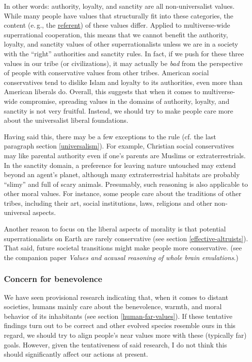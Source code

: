 In other words: authority, loyalty, and sanctity are all
non-universalist values. While many people have values that structurally
fit into these categories, the content (e.\,g., the
\href{https://en.wikipedia.org/wiki/Referent}{referent}) of these
values differ. Applied to multiverse-wide superrational cooperation,
this means that we cannot benefit the authority, loyalty, and sanctity
values of other superrationalists unless we are in a society with the
``right'' authorities and sanctity rules. In fact, if we push for these
three values in our tribe (or civilizations), it may actually be
\emph{bad} from the perspective of people with conservative values from
other tribes. American social conservatives tend to dislike Islam and
loyalty to its authorities, even more than American liberals do.
Overall, this suggests that when it comes to multiverse-wide compromise,
spreading values in the domains of authority, loyalty, and sanctity is
not very fruitful. Instead, we should try to make people care more about
the universalist liberal foundations.

Having said this, there may be a few exceptions to the rule (cf. the
last paragraph section \ref{universalism}). For example,
Christian social conservatives may like parental authority even if one's
parents are Muslims or extraterrestrials. In the sanctity domain, a
preference for leaving nature untouched may extend beyond an agent's
planet, although many extraterrestrial habitats are probably ``slimy''
and full of scary animals. Presumably, such reasoning is also applicable
to other moral values. For instance, some people care about the
traditions of other tribes, including their art, social institutions,
laws, religions and other non-universal aspects.

Another reason to focus on the liberal aspects of morality is that
potential superrationalists on Earth are rarely conservative (see
section \ref{effective-altruists}). That said, future societal transitions might make people
more conservative. (see the companion paper \textit{Values and acausal reasoning of whole brain
emulations}.)

\subsubsection{Concern for benevolence}\label{concern-for-benevolence}

We have seen provisional research indicating that, when it comes to
distant societies, humans mainly care about the benevolence, warmth, and
moral behavior of its inhabitants (see section
\ref{human-far-values}). If
these tentative findings turn out to be correct and other evolved
species resemble ours in this regard, we should try to align people's
near values more with these (typically far) goals. However, given the
tentativeness of said research, I do not think this should significantly
affect our actions at present.

